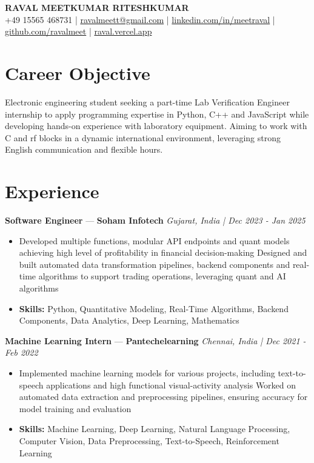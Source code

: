 \documentclass[a4paper,10pt]{article}
\begin{document}
\begin{center}
  {\Large\bfseries RAVAL MEETKUMAR RITESHKUMAR}\\[2pt]
  {\small +49 15565 468731 \;|\; \href{mailto:ravalmeett@gmail.com}{ravalmeett@gmail.com} \;|\; \href{https://www.linkedin.com/in/meetraval/}{linkedin.com/in/meetraval} \;|\; \href{https://github.com/ravalmeet}{github.com/ravalmeet} \;|\; \href{https://raval.vercel.app/}{raval.vercel.app}}
\end{center}
\vspace{-3pt}

\section*{Career Objective}
Electronic engineering student seeking a part-time Lab Verification Engineer internship to apply programming expertise in Python, C++ and JavaScript while developing hands-on experience with laboratory equipment. Aiming to work with C and rf blocks in a dynamic international environment, leveraging strong English communication and flexible hours.\par

\section*{Experience}
\textbf{Software Engineer} — \textbf{Soham Infotech} \hfill \textit{Gujarat, India \;|\; Dec 2023 - Jan 2025}\par
\vspace{1pt}
\begin{itemize}
  \item Developed multiple functions, modular API endpoints and quant models achieving high level of profitability in financial decision-making Designed and built automated data transformation pipelines, backend components and real-time algorithms to support trading operations, leveraging quant and AI algorithms
  \item \textbf{Skills:} Python, Quantitative Modeling, Real-Time Algorithms, Backend Components, Data Analytics, Deep Learning, Mathematics
\end{itemize}
\vspace{3pt}
\textbf{Machine Learning Intern} — \textbf{Pantechelearning} \hfill \textit{Chennai, India \;|\; Dec 2021 - Feb 2022}\par
\vspace{1pt}
\begin{itemize}
  \item Implemented machine learning models for various projects, including text-to-speech applications and high functional visual-activity analysis Worked on automated data extraction and preprocessing pipelines, ensuring accuracy for model training and evaluation
  \item \textbf{Skills:} Machine Learning, Deep Learning, Natural Language Processing, Computer Vision, Data Preprocessing, Text-to-Speech, Reinforcement Learning
\end{itemize}
\end{document}
